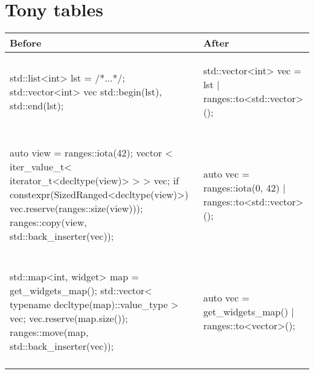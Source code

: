 \documentclass{wg21}
\begin{document}
\section{Tony tables}
\begin{center}
\begin{tabular}{l|l}
Before & After\\ \hline
\begin{minipage}[t]{0.5\textwidth}
\begin{colorblock}
std::list<int> lst = /*...*/;
std::vector<int> vec
	{std::begin(lst), std::end(lst)};
\end{colorblock}
\end{minipage}
&
\begin{minipage}[t]{0.5\textwidth}
\begin{colorblock}
std::vector<int> vec = lst | ranges::to<std::vector>();
\end{colorblock}
\end{minipage}
\\\\ \hline

\begin{minipage}[t]{0.5\textwidth}
\begin{colorblock}
auto view = ranges::iota(42);
vector <
  iter_value_t<
	iterator_t<decltype(view)>
  >
> vec;
if constexpr(SizedRanged<decltype(view)>) {
  vec.reserve(ranges::size(view)));
}
ranges::copy(view, std::back_inserter(vec));
\end{colorblock}
\end{minipage}
&
\begin{minipage}[t]{0.5\textwidth}
\begin{colorblock}
auto vec = ranges::iota(0, 42)
	| ranges::to<std::vector>();
\end{colorblock}
\end{minipage}
\\\\ \hline


\begin{minipage}[t]{0.5\textwidth}
\begin{colorblock}
std::map<int, widget> map = get_widgets_map();
std::vector<
  typename decltype(map)::value_type
> vec;
vec.reserve(map.size());
ranges::move(map, std::back_inserter(vec));
\end{colorblock}
\end{minipage}
&
\begin{minipage}[t]{0.5\textwidth}
\begin{colorblock}
auto vec = get_widgets_map()
          | ranges::to<vector>();
\end{colorblock}
\end{minipage}
\\\\ \hline

\end{tabular}
\end{center}
\end{document}
